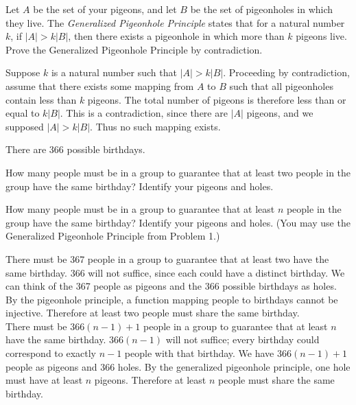 \documentclass[solution, letterpaper]{cs20}
\begin{document}


 Let $A$ be the set of your pigeons, and let $B$ be the set of pigeonholes in which they live. The \textit{Generalized Pigeonhole Principle} states that for a natural number $k$, if $|A| > k|B|$, then there exists a pigeonhole in which more than $k$ pigeons live. Prove the Generalized Pigeonhole Principle by contradiction.
 
\begin{solution}
Suppose $k$ is a natural number such that $|A| > k|B|$. Proceeding by contradiction, assume that there exists some mapping from $A$ to $B$ such that all pigeonholes contain less than $k$ pigeons. The total number of pigeons is therefore less than or equal to $k|B|$. This is a contradiction, since there are $|A|$ pigeons, and we supposed $|A| > k|B|$. Thus no such mapping exists.
\end{solution}


There are 366 possible birthdays.

\subproblem How many people must be in a group to guarantee that at least two people in the group have the same birthday? Identify your pigeons and holes.

\subproblem How many people must be in a group to guarantee that at least $n$ people in the group have the same birthday? Identify your pigeons and holes. (You may use the Generalized Pigeonhole Principle from Problem 1.)

\begin{solution}
  \subsolution There must be 367 people in a group to guarantee that at least two have the same birthday. 366 will not suffice, since each could have a distinct birthday. We can think of the 367 people as pigeons and the 366 possible birthdays as holes. By the pigeonhole principle, a function mapping people to birthdays cannot be injective. Therefore at least two people must share the same birthday. 
  \\
  \subsolution There must be $366(n-1) + 1$ people in a group to guarantee that at least $n$ have the same birthday. $366(n-1)$ will not suffice; every birthday could correspond to exactly $n-1$ people with that birthday. We have $366(n-1) + 1$ people as pigeons and 366 holes. By the generalized pigeonhole principle, one hole must have at least $n$ pigeons. Therefore at least $n$ people must share the same birthday.
\end{solution}
\end{document}
